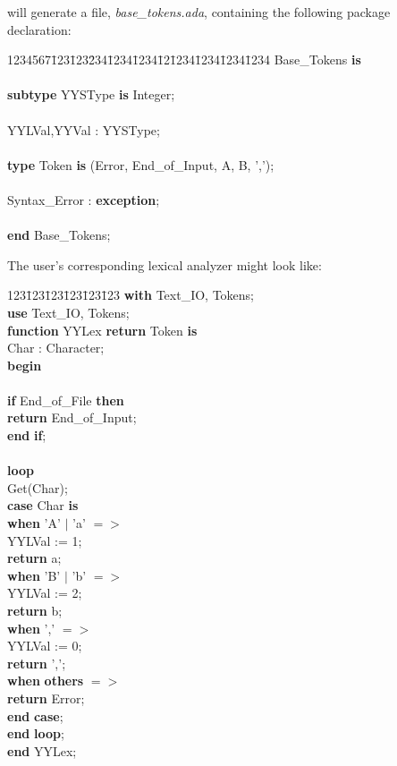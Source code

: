 \ayacc will generate a file,
{\it base\_tokens.ada},
containing the following package declaration:
\begin{tabbing}
1234567\=123\=123\=234\=1234\=1234\=12\=1234\=1234\=1234\=1234 \kill
{} Base\_Tokens {\bf is}\\
\\
\>\>  {\bf subtype} YYSType {\bf is} Integer;\\
\\
\>\>  YYLVal,YYVal : YYSType;\\
\\
\>\>  {\bf type} Token {\bf is} (Error, End\_of\_Input, A, B, ',');\\
\\
\>\>  Syntax\_Error : {\bf exception};\\
\\
{\bf end} Base\_Tokens;\\
\end{tabbing}
\newpage
\noindent The user's corresponding lexical analyzer might look like:
\begin{tabbing}
123\=123\=123\=123\=123\=123 \kill
{\bf with} Text\_IO, Tokens;\\
{\bf use}  Text\_IO, Tokens;\\
{\bf function} YYLex {\bf return} Token {\bf is}\\
\>  Char : Character;\\
{\bf begin}\\
\\
\>  {\bf if} End\_of\_File {\bf then}\\
\>\>    {\bf return} End\_of\_Input;\\
\>  {\bf end} {\bf if};\\
\\
\>  {\bf loop}\\
\>\>    Get(Char);\\
\>\>    {\bf case} Char {\bf is}\\
\>\>\>      {\bf when} 'A' $|$ 'a' $=>$\\
\>\>\>\>        YYLVal := 1;\\
\>\>\>\>        {\bf return} a;\\
\>\>\>      {\bf when} 'B' $|$ 'b' $=>$\\
\>\>\>\>        YYLVal := 2;\\
\>\>\>\>        {\bf return} b;\\
\>\>\>      {\bf when} ','       $=>$\\
\>\>\>\>        YYLVal := 0;\\
\>\>\>\>        {\bf return} ',';\\
\>\>\>      {\bf when} {\bf others}    $=>$\\
\>\>\>\>        {\bf return} Error;\\
\>\>    {\bf end} {\bf case};\\
\>  {\bf end} {\bf loop};\\
{\bf end} YYLex;\\
\end{tabbing}

